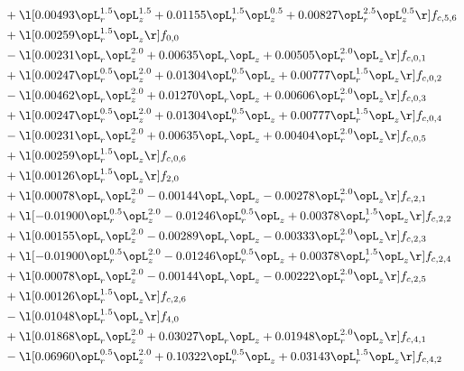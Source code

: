 \begin{alignat}{2}
& + \l[  0.00493 \opL_r^{1.5} \opL_z^{1.5} +  0.01155 \opL_r^{1.5} \opL_z^{0.5} +  0.00827 \opL_r^{2.5} \opL_z^{0.5}  \r] f_{c,5,6} \nonumber \\ 
& + \l[  0.00259 \opL_r^{1.5} \opL_z  \r] f_{0,0} \nonumber \\ 
& - \l[  0.00231 \opL_r \opL_z^{2.0} +  0.00635 \opL_r \opL_z +  0.00505 \opL_r^{2.0} \opL_z  \r] f_{c,0,1} \nonumber \\ 
& + \l[  0.00247 \opL_r^{0.5} \opL_z^{2.0} +  0.01304 \opL_r^{0.5} \opL_z +  0.00777 \opL_r^{1.5} \opL_z  \r] f_{c,0,2} \nonumber \\ 
& - \l[  0.00462 \opL_r \opL_z^{2.0} +  0.01270 \opL_r \opL_z +  0.00606 \opL_r^{2.0} \opL_z  \r] f_{c,0,3} \nonumber \\ 
& + \l[  0.00247 \opL_r^{0.5} \opL_z^{2.0} +  0.01304 \opL_r^{0.5} \opL_z +  0.00777 \opL_r^{1.5} \opL_z  \r] f_{c,0,4} \nonumber \\ 
& - \l[  0.00231 \opL_r \opL_z^{2.0} +  0.00635 \opL_r \opL_z +  0.00404 \opL_r^{2.0} \opL_z  \r] f_{c,0,5} \nonumber \\ 
& + \l[  0.00259 \opL_r^{1.5} \opL_z  \r] f_{c,0,6} \nonumber \\ 
& + \l[  0.00126 \opL_r^{1.5} \opL_z  \r] f_{2,0} \nonumber \\ 
& + \l[  0.00078 \opL_r \opL_z^{2.0}   -0.00144 \opL_r \opL_z   -0.00278 \opL_r^{2.0} \opL_z  \r] f_{c,2,1} \nonumber \\ 
& + \l[  -0.01900 \opL_r^{0.5} \opL_z^{2.0}   -0.01246 \opL_r^{0.5} \opL_z +  0.00378 \opL_r^{1.5} \opL_z  \r] f_{c,2,2} \nonumber \\ 
& + \l[  0.00155 \opL_r \opL_z^{2.0}   -0.00289 \opL_r \opL_z   -0.00333 \opL_r^{2.0} \opL_z  \r] f_{c,2,3} \nonumber \\ 
& + \l[  -0.01900 \opL_r^{0.5} \opL_z^{2.0}   -0.01246 \opL_r^{0.5} \opL_z +  0.00378 \opL_r^{1.5} \opL_z  \r] f_{c,2,4} \nonumber \\ 
& + \l[  0.00078 \opL_r \opL_z^{2.0}   -0.00144 \opL_r \opL_z   -0.00222 \opL_r^{2.0} \opL_z  \r] f_{c,2,5} \nonumber \\ 
& + \l[  0.00126 \opL_r^{1.5} \opL_z  \r] f_{c,2,6} \nonumber \\ 
& - \l[  0.01048 \opL_r^{1.5} \opL_z  \r] f_{4,0} \nonumber \\ 
& + \l[  0.01868 \opL_r \opL_z^{2.0} +  0.03027 \opL_r \opL_z +  0.01948 \opL_r^{2.0} \opL_z  \r] f_{c,4,1} \nonumber \\ 
& - \l[  0.06960 \opL_r^{0.5} \opL_z^{2.0} +  0.10322 \opL_r^{0.5} \opL_z +  0.03143 \opL_r^{1.5} \opL_z  \r] f_{c,4,2} \nonumber \\ 

\end{alignat}
